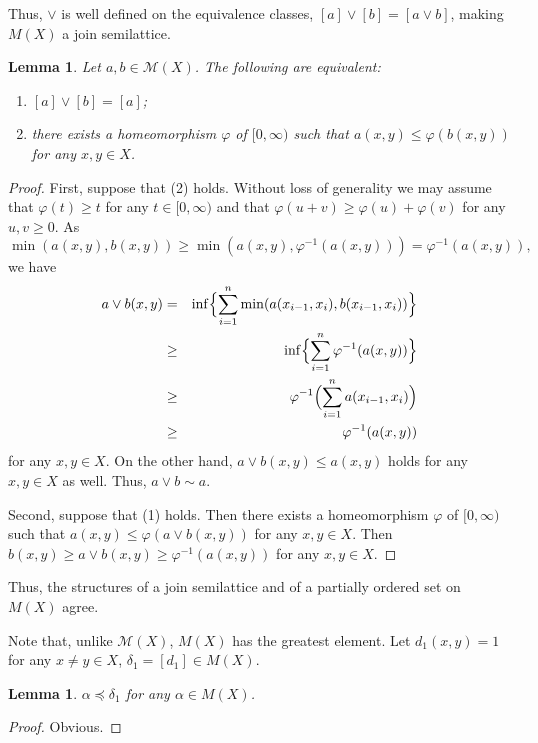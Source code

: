 \documentclass[reqno,12pt]{amsart}
\theoremstyle{plain}%
\newtheorem{lem}[thm]{Lemma}
\theoremstyle{definition}
\theoremstyle{remark}
\numberwithin{equation}{section}
\begin{document}
Thus, $\lor$ is well defined on the equivalence classes, $[a]\lor[b]=[a\lor b]$, making $M(X)$ a join semilattice. 

\begin{lem}
Let $a,b\in \mathcal M(X)$. The following are equivalent: 
\begin{enumerate}
\item
$[a]\lor[b]=[a]$; 
\item
there exists a homeomorphism $\varphi$ of $[0,\infty)$ such that $a(x,y)\leq \varphi(b(x,y))$ for any $x,y\in X$. 

\end{enumerate}
\end{lem}
\begin{proof}
First, suppose that (2) holds. Without loss of generality we may assume that $\varphi(t)\geq t$ for any $t\in[0,\infty)$ and that $\varphi(u+v)\geq \varphi(u)+\varphi(v)$ for any $u,v\geq 0$.
As 
$$
\min(a(x,y),b(x,y))\geq \min(a(x,y),\varphi^{-1}(a(x,y)))=\varphi^{-1}(a(x,y)),
$$
we have
\begin{eqnarray*}
a\lor b(x,y)&=&\inf\Bigl\{\sum_{i=1}^n \min(a(x_{i-1},x_i),b(x_{i-1},x_i))\Bigr\}\\
&\geq& \inf\Bigl\{\sum_{i=1}^n \varphi^{-1}(a(x,y))\Bigr\}\\
&\geq&\varphi^{-1}\Bigl(\sum_{i=1}^n a(x_{i-1},x_i)\Bigr)\\
&\geq&\varphi^{-1}(a(x,y))
\end{eqnarray*}
for any $x,y\in X$. On the other hand, $a\lor b(x,y)\leq a(x,y)$ holds for any $x,y\in X$ as well. Thus, $a\lor b\sim a$.

Second, suppose that (1) holds. Then there exists a homeomorphism $\varphi$ of $[0,\infty)$ such that $a(x,y)\leq \varphi(a\lor b(x,y))$ for any $x,y\in X$.
Then $b(x,y)\geq a\lor b(x,y)\geq\varphi^{-1}(a(x,y))$ for any $x,y\in X$.
\end{proof}
 
Thus, the structures of a join semilattice and of a partially ordered set on $M(X)$ agree.

Note that, unlike $\mathcal M(X)$, $M(X)$ has the greatest element.  
Let $d_1(x,y)=1$ for any $x\neq y\in X$, $\delta_1=[d_1]\in M(X)$. 

\begin{lem}
$\alpha\preceq\delta_1$ for any $\alpha\in M(X)$.

\end{lem}
\begin{proof}
Obvious.
\end{proof}
\end{document}
